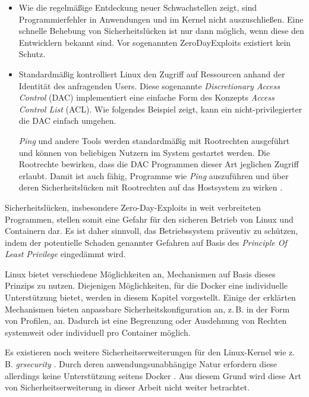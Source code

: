 \documentclass[../main.tex]{subfiles}
\begin{document}
		\begin{itemize}
			\item	Wie die regelmäßige Entdeckung neuer Schwachstellen zeigt, sind Programmierfehler in Anwendungen und im Kernel nicht auszuschließen. Eine schnelle Behebung von Sicherheitslücken ist nur dann möglich, wenn diese den Entwicklern bekannt sind. Vor sogenannten \glspl{ZeroDayExploit} existiert kein Schutz.
			\item	Standardmäßig kontrolliert Linux den Zugriff auf Ressourcen anhand der Identität des anfragenden Users. Diese sogenannte \emph{Discretionary Access Control} (\acrshort{DAC}) implementiert eine einfache Form des Konzepts \emph{Access Control List} (\acrshort{ACL}). Wie folgendes Beispiel zeigt, kann ein nicht-privilegierter \cbroken{} die DAC einfach umgehen.

			\clearpage

			\emph{Ping} und andere Tools werden standardmäßig mit Rootrechten ausgeführt und können von beliebigen Nutzern im System gestartet werden. Die Rootrechte bewirken, dass die DAC Programmen dieser Art jeglichen Zugriff erlaubt. Damit ist auch \cbroken{} fähig, Programme wie \emph{Ping} auszuführen und über deren Sicherheitslücken mit Rootrechten auf das Hostsystem zu wirken \cite[S.26]{SELinuxApparmor}.
		\end{itemize}

		Sicherheitslücken, insbesondere Zero-Day-Exploits in weit verbreiteten Programmen, stellen somit eine Gefahr für den sicheren Betrieb von Linux und Containern dar. Es ist daher sinnvoll, das Betriebssystem präventiv zu schützen, indem der potentielle Schaden genannter Gefahren auf Basis des \emph{Principle Of Least Privilege} eingedämmt wird.

		Linux bietet verschiedene Möglichkeiten an, Mechanismen auf Basis dieses Prinzips zu nutzen. Diejenigen Möglichkeiten, für die Docker eine individuelle Unterstützung bietet, werden in diesem Kapitel vorgestellt. Einige der erklärten Mechanismen bieten anpassbare Sicherheitskonfiguration an, z.\,B. in der Form von Profilen, an. Dadurch ist eine Begrenzung oder Ausdehnung von Rechten systemweit oder individuell pro Container möglich.

		Es existieren noch weitere Sicherheitserweiterungen für den Linux-Kernel wie z.\,B. \emph{grsecurity} \cite{grsecurity}. Durch deren anwendungsunabhängige Natur erfordern diese allerdings keine Unterstützung seitens Docker \cite{dockerSecurity}. Aus diesem Grund wird diese Art von Sicherheitserweiterung in dieser Arbeit nicht weiter betrachtet.
\end{document}
